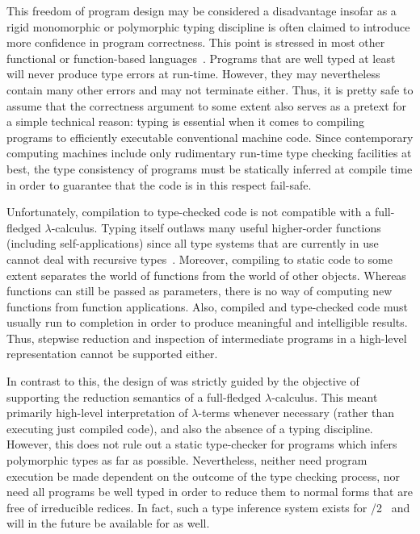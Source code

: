 This freedom of program design may be considered a
 disadvantage insofar as a rigid monomorphic or polymorphic
 typing discipline is often claimed
to introduce more confidence in program correctness. This point is 
stressed in most other functional or function-based languages~\cite{turn85a,harp88a,huda88}. Programs that are
well typed at least will never produce type errors at run-time. However, they may nevertheless contain many other errors and may not terminate either.
Thus, it is pretty safe to assume that the correctness argument
 to some extent also serves as a pretext for a simple technical reason:
typing is essential when it comes to compiling  programs to
efficiently executable conventional machine code. Since 
contemporary computing machines include only 
rudimentary run-time type checking facilities at best,  the type consistency of programs must be statically
inferred at compile time in order to guarantee that the code is in this respect fail-safe.

Unfortunately, compilation to type-checked code is not compatible with
a full-fledged
 $\lambda$-calculus. Typing itself outlaws many useful higher-order
functions (including self-applications) since all type systems that are
currently in use cannot deal with recursive types~\cite{miln78,hind86}. Moreover,
compiling to static code to some 
extent separates the world of functions from the world of other 
objects. 
Whereas functions can still be passed as
parameters, there is no way of computing new functions from function
applications. Also, compiled and type-checked code must usually run
 to completion in order to produce meaningful and 
intelligible results. Thus, stepwise reduction and inspection of
intermediate programs in a high-level representation cannot be
supported either. 

In contrast to this, the design of \pired was strictly 
guided by the objective
of supporting the reduction
 semantics of a full-fledged $\lambda$-calculus. 
This meant primarily high-level interpretation of $\lambda$-terms
whenever necessary 
(rather than executing just compiled code), and also the absence of a typing discipline.
However, this does not rule out a static type-checker for
\kir programs which infers polymorphic 
types as far as possible. Nevertheless, neither need program execution
be made dependent on the outcome of the type checking process, nor
need all \kir programs be well typed in order
to reduce them to normal forms that are free of irreducible redices. 
In fact, such a type inference system exists for \orel/2~\cite{ples90,zim91} 
and will
in the future be available for \kir as well.
 
